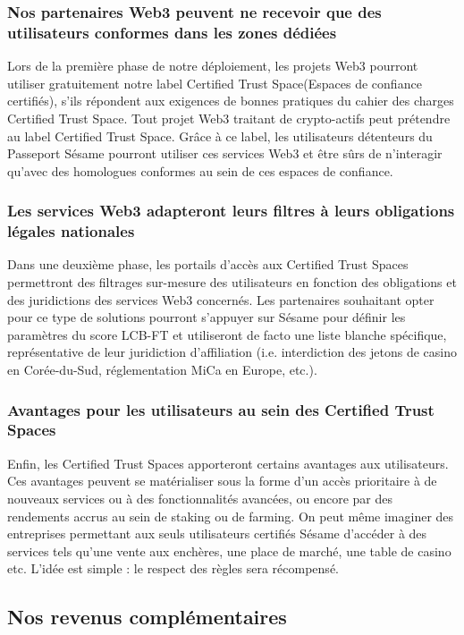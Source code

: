 ﻿\documentclass[a4paper]{article}
\let\OldTexttrademark\texttrademark
\renewcommand{\texttrademark}{\OldTexttrademark\xspace}%
\begin{document}
\subsubsection{Nos partenaires Web3 peuvent ne recevoir que des utilisateurs conformes dans les zones dédiées}
Lors de la première phase de notre déploiement, les projets Web3 pourront utiliser gratuitement notre label Certified Trust Space\texttrademark (Espaces de confiance certifiés), s’ils répondent aux exigences de bonnes pratiques du cahier des charges Certified Trust Space\texttrademark. Tout projet Web3 traitant de crypto-actifs peut prétendre au label Certified Trust Space\OldTexttrademark. Grâce à ce label, les utilisateurs détenteurs du Passeport Sésame pourront utiliser ces services Web3 et être sûrs de n'interagir qu'avec des homologues conformes au sein de ces espaces de confiance.

\subsubsection{Les services Web3 adapteront leurs filtres à leurs obligations légales nationales}
Dans une deuxième phase, les portails d’accès aux Certified Trust Spaces permettront des filtrages sur-mesure des utilisateurs en fonction des obligations et des juridictions des services Web3 concernés. Les partenaires souhaitant opter pour ce type de solutions pourront s'appuyer sur Sésame pour définir les paramètres du score LCB-FT et utiliseront de facto une liste blanche spécifique, représentative de leur juridiction d'affiliation (i.e. interdiction des jetons de casino en Corée-du-Sud, réglementation MiCa en Europe, etc.).

\subsubsection{Avantages pour les utilisateurs au sein des Certified Trust Spaces\texttrademark} 
Enfin, les Certified Trust Spaces\texttrademark apporteront certains avantages aux utilisateurs. Ces avantages peuvent se matérialiser sous la forme d'un accès prioritaire à de nouveaux services ou à des fonctionnalités avancées, ou encore par des rendements accrus au sein de staking ou de farming. On peut même imaginer des entreprises permettant aux seuls utilisateurs certifiés Sésame d'accéder à des services tels qu'une vente aux enchères, une place de marché, une table de casino etc. L'idée est simple : le respect des règles sera récompensé.

\subsection{Nos revenus complémentaires}
\end{document}

